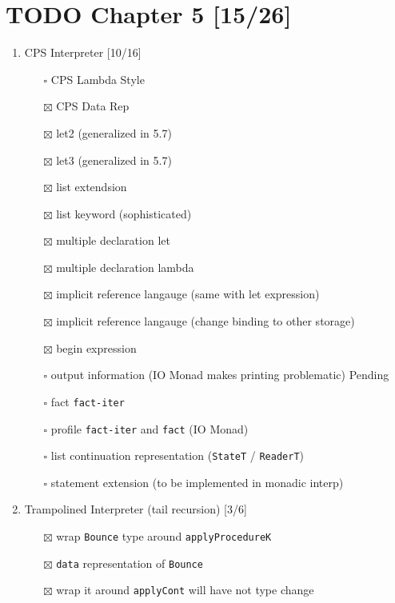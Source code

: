 \documentclass[11pt]{article}
\date{\today}
\title{}
\begin{document}
\tableofcontents

\section{{\bfseries\sffamily TODO} Chapter 5 [15/26]}
\label{sec:org51a723b}
\begin{enumerate}
\item CPS Interpreter [10/16]
\begin{enumerate}
\item[{$\square$}] CPS Lambda Style
\item[{$\boxtimes$}] CPS Data Rep
\item[{$\boxtimes$}] let2 (generalized in 5.7)
\item[{$\boxtimes$}] let3 (generalized in 5.7)
\item[{$\boxtimes$}] list extendsion
\item[{$\boxtimes$}] list keyword (sophisticated)
\item[{$\boxtimes$}] multiple declaration let
\item[{$\boxtimes$}] multiple declaration lambda
\item[{$\boxtimes$}] implicit reference langauge (same with let expression)
\item[{$\boxtimes$}] implicit reference langauge (change binding to other storage)
\item[{$\boxtimes$}] begin expression
\item[{$\square$}] output information (IO Monad makes printing problematic) Pending
\item[{$\square$}] fact \texttt{fact-iter}
\item[{$\square$}] profile \texttt{fact-iter} and \texttt{fact}  (IO Monad)
\item[{$\square$}] list continuation representation (\texttt{StateT} / \texttt{ReaderT})
\item[{$\square$}] statement extension (to be implemented in monadic interp)
\end{enumerate}
\item Trampolined Interpreter (tail recursion) [3/6] 
\begin{enumerate}
\setcounter{enumii}{16}
\item[{$\boxtimes$}] wrap \texttt{Bounce} type around \texttt{applyProcedureK}
\item[{$\boxtimes$}] \texttt{data} representation of \texttt{Bounce}
\item[{$\boxtimes$}] wrap it around \texttt{applyCont} will have not type change

\end{enumerate}
\end{enumerate}
\end{document}
